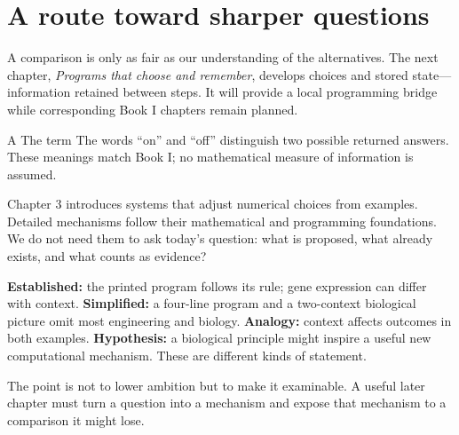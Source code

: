 \clearpage
\section{A route toward sharper questions}\label{sec:roadmap}
A comparison is only as fair as our understanding of the alternatives. The next chapter, \emph{Programs that choose and remember}, develops choices and stored state---information retained between steps. It will provide a local programming bridge while corresponding Book I chapters remain planned.

A  The term  The words “on” and “off” distinguish two possible returned answers. These meanings match Book I; no mathematical measure of information is assumed.

Chapter 3 introduces systems that adjust numerical choices from examples. Detailed mechanisms follow their mathematical and programming foundations. We do not need them to ask today's question: what is proposed, what already exists, and what counts as evidence?

\textbf{Established:} the printed program follows its rule; gene expression can differ with context. \textbf{Simplified:} a four-line program and a two-context biological picture omit most engineering and biology. \textbf{Analogy:} context affects outcomes in both examples. \textbf{Hypothesis:} a biological principle might inspire a useful new computational mechanism. These are different kinds of statement.

The point is not to lower ambition but to make it examinable. A useful later chapter must turn a question into a mechanism and expose that mechanism to a comparison it might lose.

\clearpage
